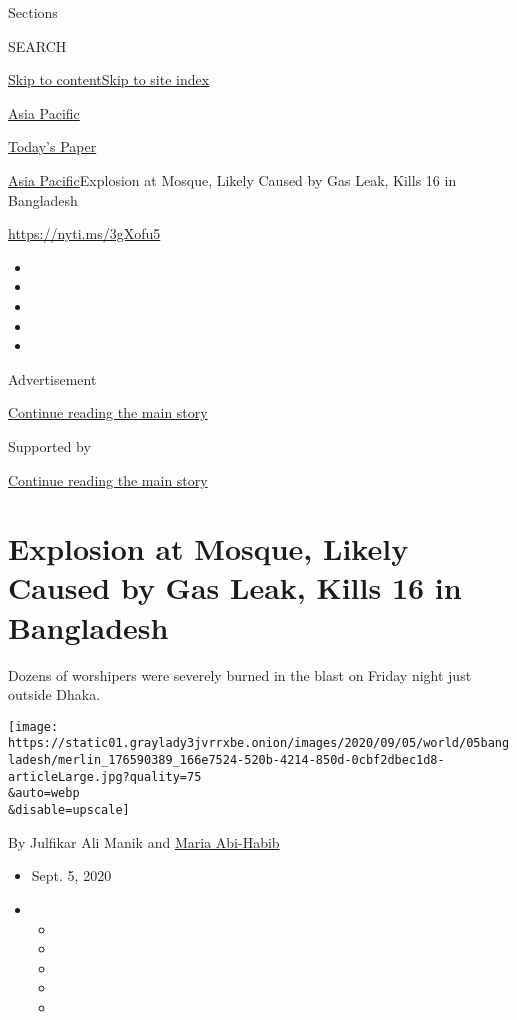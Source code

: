 Sections

SEARCH

\protect\hyperlink{site-content}{Skip to
content}\protect\hyperlink{site-index}{Skip to site index}

\href{https://www.nytimes3xbfgragh.onion/section/world/asia}{Asia
Pacific}

\href{https://myaccount.nytimes3xbfgragh.onion/auth/login?response_type=cookie\&client_id=vi}{}

\href{https://www.nytimes3xbfgragh.onion/section/todayspaper}{Today's
Paper}

\href{/section/world/asia}{Asia Pacific}\textbar{}Explosion at Mosque,
Likely Caused by Gas Leak, Kills 16 in Bangladesh

\url{https://nyti.ms/3gXofu5}

\begin{itemize}
\item
\item
\item
\item
\item
\end{itemize}

Advertisement

\protect\hyperlink{after-top}{Continue reading the main story}

Supported by

\protect\hyperlink{after-sponsor}{Continue reading the main story}

\hypertarget{explosion-at-mosque-likely-caused-by-gas-leak-kills-16-in-bangladesh}{%
\section{Explosion at Mosque, Likely Caused by Gas Leak, Kills 16 in
Bangladesh}\label{explosion-at-mosque-likely-caused-by-gas-leak-kills-16-in-bangladesh}}

Dozens of worshipers were severely burned in the blast on Friday night
just outside Dhaka.

\texttt{[image: https://static01.graylady3jvrrxbe.onion/images/2020/09/05/world/05bangladesh/merlin\_176590389\_166e7524-520b-4214-850d-0cbf2dbec1d8-articleLarge.jpg?quality=75\\\&auto=webp\\\&disable=upscale]}

By Julfikar Ali Manik and
\href{https://www.nytimes3xbfgragh.onion/by/maria-abi-habib}{Maria
Abi-Habib}

\begin{itemize}
\item
  Sept. 5, 2020
\item
  \begin{itemize}
  \item
  \item
  \item
  \item
  \item
  \end{itemize}
\end{itemize}

